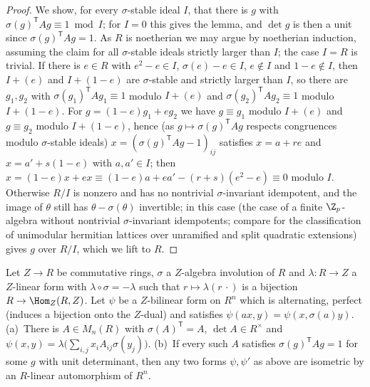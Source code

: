 \begin{proof}
We show, for every $\sigma$-stable ideal $I$, that there is $g$ with $\sigma(g)^{\mathsf T}Ag\equiv1\bmod I$; for $I=0$ this
gives the lemma, and $\det g$ is then a unit since $\sigma(g)^{\mathsf T}Ag=1$. As $R$ is noetherian we may argue by
noetherian induction, assuming the claim for all $\sigma$-stable ideals strictly larger than $I$; the case $I=R$ is trivial.
If there is $e\in R$ with $e^2-e\in I$, $\sigma(e)-e\in I$, $e\notin I$ and $1-e\notin I$, then $I+(e)$ and $I+(1-e)$ are
$\sigma$-stable and strictly larger than $I$, so there are $g_1,g_2$ with $\sigma(g_1)^{\mathsf T}Ag_1\equiv1$ modulo
$I+(e)$ and $\sigma(g_2)^{\mathsf T}Ag_2\equiv1$ modulo $I+(1-e)$. For $g=(1-e)g_1+eg_2$ we have $g\equiv g_1$ modulo
$I+(e)$ and $g\equiv g_2$ modulo $I+(1-e)$, hence (as $g\mapsto\sigma(g)^{\mathsf T}Ag$ respects congruences modulo
$\sigma$-stable ideals) $x=(\sigma(g)^{\mathsf T}Ag-1)_{ij}$ satisfies $x=a+re$ and $x=a'+s(1-e)$ with $a,a'\in I$; then
$x=(1-e)x+ex\equiv(1-e)a+ea'-(r+s)(e^2-e)\equiv0$ modulo $I$. Otherwise $R/I$ is nonzero and has no nontrivial
$\sigma$-invariant idempotent, and the image of $\theta$ still has $\theta-\sigma(\theta)$ invertible; in this case
 (the case of a finite $\Z_p$-algebra without nontrivial
$\sigma$-invariant idempotents; compare \cite{Jacobowitz1962} for the classification of unimodular hermitian lattices over
unramified and split quadratic extensions) gives $g$ over $R/I$, which we lift to $R$.
\end{proof}

\begin{lemma}\label{pf:tower:std}
Let $Z\to R$ be commutative rings, $\sigma$ a $Z$-algebra involution of $R$ and $\lambda\colon R\to Z$ a $Z$-linear form with
$\lambda\circ\sigma=-\lambda$ such that $r\mapsto\lambda(r\,\cdot)$ is a bijection $R\to\Hom_Z(R,Z)$. Let $\psi$ be a
$Z$-bilinear form on $R^n$ which is alternating, perfect (induces a bijection onto the $Z$-dual) and satisfies
$\psi(ax,y)=\psi(x,\sigma(a)y)$.
(a)~There is $A\in M_n(R)$ with $\sigma(A)^{\mathsf T}=A$, $\det A\in R^\times$ and
$\psi(x,y)=\lambda\bigl(\sum_{i,j}x_iA_{ij}\sigma(y_j)\bigr)$.
(b)~If every such $A$ satisfies $\sigma(g)^{\mathsf T}Ag=1$ for some $g$ with unit determinant, then any two forms $\psi,\psi'$ as
above are isometric by an $R$-linear automorphism of $R^n$.
\end{lemma}

